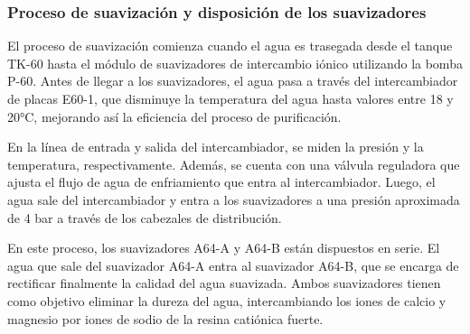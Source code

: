 
\subsubsection{Proceso de suavización y disposición de los suavizadores}

El proceso de suavización comienza cuando el agua es trasegada desde el tanque TK-60 hasta el módulo de suavizadores de intercambio iónico utilizando la bomba P-60. Antes de llegar a los suavizadores, el agua pasa a través del intercambiador de placas E60-1, que disminuye la temperatura del agua hasta valores entre 18 y 20°C, mejorando así la eficiencia del proceso de purificación.


En la línea de entrada y salida del intercambiador, se miden la presión y la temperatura, respectivamente. Además, se cuenta con una válvula reguladora que ajusta el flujo de agua de enfriamiento que entra al intercambiador. Luego, el agua sale del intercambiador y entra a los suavizadores a una presión aproximada de 4 bar a través de los cabezales de distribución.


En este proceso, los suavizadores A64-A y A64-B están dispuestos en serie. El agua que sale del suavizador A64-A entra al suavizador A64-B, que se encarga de rectificar finalmente la calidad del agua suavizada. Ambos suavizadores tienen como objetivo eliminar la dureza del agua, intercambiando los iones de calcio y magnesio por iones de sodio de la resina catiónica fuerte.

